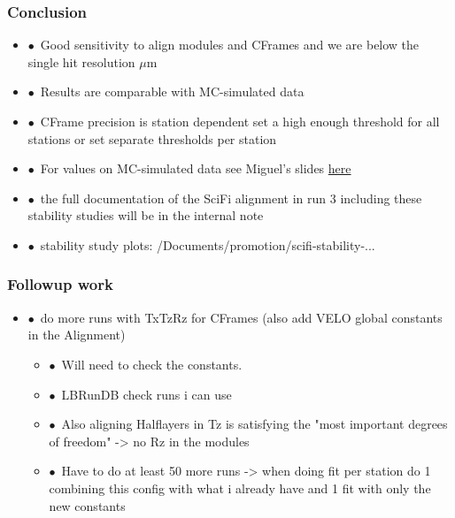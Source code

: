\documentclass[aspectratio=1610, 12pt, xcolor=dvipsnames]{beamer}
\begin{document}
\begin{frame}\frametitle{Conclusion}
  \begin{itemize}
    \item $\bullet$\, Good sensitivity to align modules and CFrames and we are below the single hit resolution  $\mu$m
    \item $\bullet$\, Results are comparable with MC-simulated data
    \item $\bullet$\, CFrame precision is station dependent \to set a high enough threshold for all stations or set separate thresholds per station
    \item $\bullet$\, For values on MC-simulated data see Miguel's slides \href{https://indico.cern.ch/event/1475162/contributions/6240307/attachments/2976257/5239245/Alignment_precision_WP4.pdf}{here}
    \item $\bullet$\, the full documentation of the SciFi alignment in run 3 including these stability studies will be in the internal note
    \item $\bullet$\, stability study plots: /Documents/promotion/scifi-stability-...
  \end{itemize}
\end{frame}

\begin{frame}\frametitle{Followup work}
  \begin{itemize}
    \item $\bullet$\, do more runs with TxTzRz for CFrames (also add VELO global constants in the Alignment)
    \begin{itemize}
      \item $\bullet$\, Will need to check the constants. 
      \item $\bullet$\, LBRunDB check runs i can use
      \item $\bullet$\, Also aligning Halflayers in Tz is satisfying the "most important degrees of freedom" -> no Rz in the modules
      \item $\bullet$\, Have to do at least 50 more runs -> when doing fit per station do 1 combining this config with what i already have and 1 fit with only the new constants
    \end{itemize}
  \end{itemize}
\end{frame}
\end{document}
